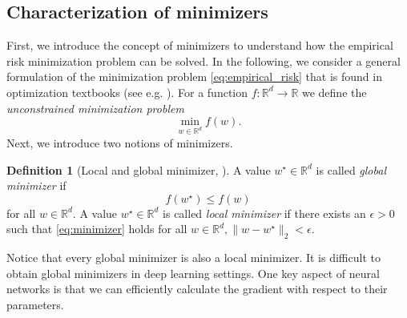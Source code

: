 \documentclass[12pt]{article}
\theoremstyle{definition}
\newtheorem{definition}[definition]{Definition}
\numberwithin{equation}{section}
\newcommand{\R}{\mathbb{R}}
\newcommand{\norm}[1]{\lVert{#1}\rVert_2}
\begin{document}
\subsection{Characterization of minimizers}
First, we introduce the concept of minimizers to understand how the empirical risk minimization problem can be solved. In the following, we consider a general formulation of the minimization problem \eqref{eq:empirical_risk} that is found in optimization textbooks (see e.g. \cite{nocedalNumericalOptimization2006}). For a function $f:\R^d \rightarrow \R$ we define the \emph{unconstrained minimization problem}
\begin{equation}
  \min_{w \in \R^d} f(w).
\end{equation}
Next, we introduce two notions of minimizers.
\begin{definition}[Local and global minimizer, ]
  A value $w^\star \in \R^d$ is called \emph{global minimizer} if 
  \begin{equation}
    \label{eq:minimizer}
    f(w^\star) \leq f(w)
  \end{equation} 
  for all $w \in \R^d$. A value $w^\star \in \R^d$ is called \emph{local minimizer} if there exists an $\epsilon > 0$ such that \eqref{eq:minimizer} holds for all $w \in \R^d, \norm{w-w^\star} < \epsilon$.
\end{definition}
Notice that every global minimizer is also a local minimizer. It is difficult to obtain global minimizers in deep learning settings. One key aspect of neural networks is that we can efficiently calculate the gradient with respect to their parameters. 
\end{document}
